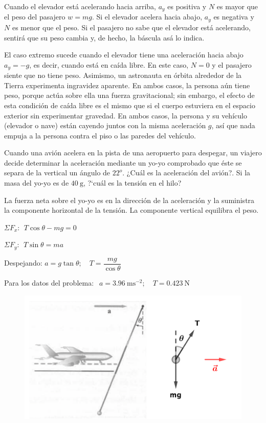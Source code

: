 \footnotesize{\textsf{Cuando el elevador está acelerando hacia arriba, $a_y$   es positiva y $N$ es mayor que el peso del pasajero $ \textit{w} = mg$. Si el elevador acelera hacia abajo, $a_y$   es negativa y $N$ es menor que el peso. Si el pasajero no sabe que el elevador está acelerando, sentirá que su peso cambia y, de hecho, la báscula asá lo indica.}} 

\footnotesize{\textsf{El caso extremo sucede cuando el elevador tiene una aceleración hacia abajo  $a_y=-g$, es decir, cuando está en caída libre. En este caso, $N=0$  y el pasajero siente que no tiene peso. Asimismo, un astronauta en órbita alrededor de la Tierra experimenta ingravidez aparente. En ambos casos, la persona aún tiene peso, porque actúa sobre ella una fuerza gravitacional; sin embargo, el efecto de esta condición de caída libre es el mismo que si el cuerpo estuviera en el espacio exterior sin experimentar gravedad. En ambos casos, la persona y su vehículo (elevador o nave) están cayendo juntos con la misma aceleración $g$, así que nada empuja a la persona contra el piso o las paredes del vehículo}}\normalsize{.}

\begin{prob}
Cuando una avión acelera en la pista de una aeropuerto para despegar, un viajero decide determinar la aceleración mediante un yo-yo comprobado que éste se separa de la vertical un ángulo de $22^o$. ¿Cuál es la aceleración del avión?. Si la masa del yo-yo es de $40\ \mathrm{g}$, ?`cuál es la tensión en el hilo?	
\end{prob}

\begin{multicols}{2}
La fuerza neta sobre el yo-yo es en la dirección de la aceleración y la suministra la componente horizontal de la tensión. La componente vertical equilibra el peso.

$\Sigma F_x: \ \ T \cos \theta-mg=0$

$\Sigma F_y: \ \ T \sin \theta = m a$

Despejando:  
$a=g \tan \theta; \quad T=\dfrac{mg}{\cos \theta}$

Para los datos del problema:  $\ \ a=3.96\ \mathrm{ms}^{-2}; \quad T=0.423\ \mathrm{N}$

\begin{figure}[H]
	\centering
	\includegraphics[width=.55\textwidth]{imagenes/imagenes03/T03IM64.png}
	\end{figure}
\end{multicols}	
	
